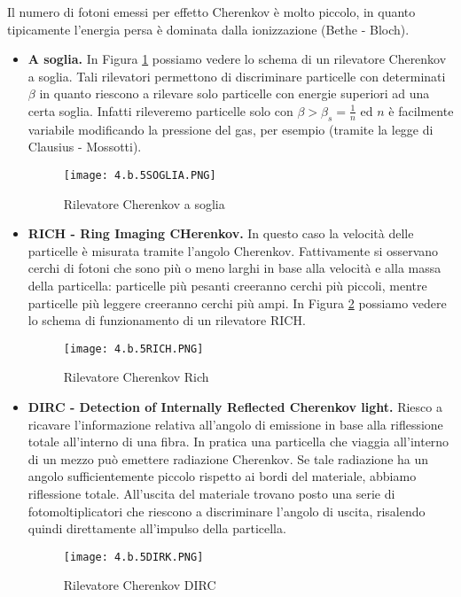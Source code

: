 \documentclass[twoside]{article}
\begin{document}
Il numero di fotoni emessi per effetto Cherenkov è molto piccolo, in quanto tipicamente l'energia persa è dominata dalla ionizzazione (Bethe - Bloch).
\begin{itemize}
\item \textbf{A soglia.} In Figura \ref{fig:soglia} possiamo vedere lo schema di un rilevatore Cherenkov a soglia. Tali rilevatori permettono di discriminare particelle con determinati $\beta$ in quanto riescono a rilevare solo particelle con energie superiori ad una certa soglia. Infatti rileveremo particelle solo con $\beta > \beta_s = \frac{1}{n}$ ed $n$ è facilmente variabile modificando la pressione del gas, per esempio (tramite la legge di Clausius - Mossotti).

\begin{figure}[H]
    \centering
    \texttt{[image: 4.b.5SOGLIA.PNG]}
    \caption{Rilevatore Cherenkov a soglia} \label{fig:soglia}
\end{figure}


\item \textbf{RICH - Ring Imaging CHerenkov.} In questo caso la velocità delle particelle è misurata tramite l'angolo Cherenkov. Fattivamente si osservano cerchi di fotoni che sono più o meno larghi in base alla velocità e alla massa della particella: particelle più pesanti creeranno cerchi più piccoli, mentre particelle più leggere creeranno cerchi più ampi. In Figura \ref{fig:rich} possiamo vedere lo schema di funzionamento di un rilevatore RICH.

\begin{figure}[H]
    \centering
    \texttt{[image: 4.b.5RICH.PNG]}
    \caption{Rilevatore Cherenkov Rich} \label{fig:rich}
\end{figure}


\item \textbf{DIRC - Detection of Internally Reflected Cherenkov light.} Riesco a ricavare l'informazione relativa all'angolo di emissione in base alla riflessione totale all'interno di una fibra. In pratica una particella che viaggia all'interno di un mezzo può emettere radiazione Cherenkov. Se tale radiazione ha un angolo sufficientemente piccolo rispetto ai bordi del materiale, abbiamo riflessione totale. All'uscita del materiale trovano posto una serie di fotomoltiplicatori che riescono a discriminare l'angolo di uscita, risalendo quindi direttamente all'impulso della particella.

\begin{figure}[H]
    \centering
    \texttt{[image: 4.b.5DIRK.PNG]}
    \caption{Rilevatore Cherenkov DIRC} \label{fig:dirc}
\end{figure}
\end{itemize}
\end{document}
